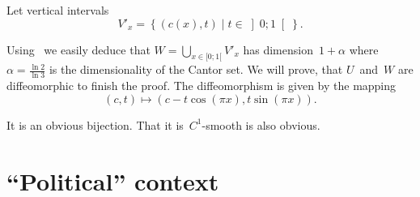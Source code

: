\documentclass[oneside,draft]{amsart}
\newcommand{\setcond}[2]{\left\{#1\mid#2\right\}}
\newcommand{\diam}{\operatorname{diam}}
\begin{document}
Let vertical intervals \[ V'_x = \setcond{(c(x), t)}{t\in\left]0;1\right[}. \]

Using~\cite{189275} we easily deduce that $W=\bigcup_{x\in[0;1[}V'_x$ has dimension~$1+\alpha$ where $\alpha=\frac{\ln 2}{\ln 3}$ is the dimensionality of the Cantor set. We will prove, that $U$~and~$W$ are diffeomorphic to finish the proof. The diffeomorphism is given by the mapping \[ (c,t) \mapsto (c-t\cos(\pi x), t\sin(\pi x)). \]

It is an obvious bijection. That it is~$C^1$-smooth is also obvious.










\section{``Political'' context}
\end{document}
